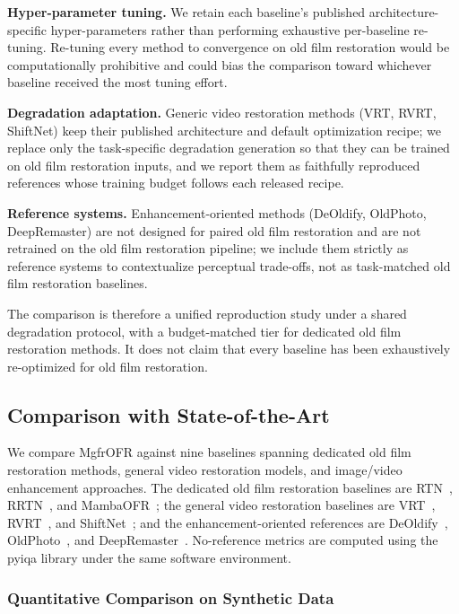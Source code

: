 \textbf{Hyper-parameter tuning.} We retain each baseline's published architecture-specific hyper-parameters rather than performing exhaustive per-baseline re-tuning. Re-tuning every method to convergence on old film restoration would be computationally prohibitive and could bias the comparison toward whichever baseline received the most tuning effort.

\textbf{Degradation adaptation.} Generic video restoration methods (VRT, RVRT, ShiftNet) keep their published architecture and default optimization recipe; we replace only the task-specific degradation generation so that they can be trained on old film restoration inputs, and we report them as faithfully reproduced references whose training budget follows each released recipe.

\textbf{Reference systems.} Enhancement-oriented methods (DeOldify, OldPhoto, DeepRemaster) are not designed for paired old film restoration and are not retrained on the old film restoration pipeline; we include them strictly as reference systems to contextualize perceptual trade-offs, not as task-matched old film restoration baselines.

The comparison is therefore a unified reproduction study under a shared degradation protocol, with a budget-matched tier for dedicated old film restoration methods. It does not claim that every baseline has been exhaustively re-optimized for old film restoration.

\subsection{Comparison with State-of-the-Art}
\label{subsec:comparison_sota}

We compare MgfrOFR against nine baselines spanning dedicated old film restoration methods, general video restoration models, and image/video enhancement approaches. The dedicated old film restoration baselines are RTN~\cite{wan2022rtn}, RRTN~\cite{lin2024rrtn}, and MambaOFR~\cite{mao2025mambaofr}; the general video restoration baselines are VRT~\cite{liang2024vrt}, RVRT~\cite{liang2022rvrt}, and ShiftNet~\cite{li2023shiftnet}; and the enhancement-oriented references are DeOldify~\cite{jantic2019deoldify}, OldPhoto~\cite{wan2023oldphotopami}, and DeepRemaster~\cite{iizuka2019deepremaster}. No-reference metrics are computed using the pyiqa library under the same software environment.

\subsubsection{Quantitative Comparison on Synthetic Data}

